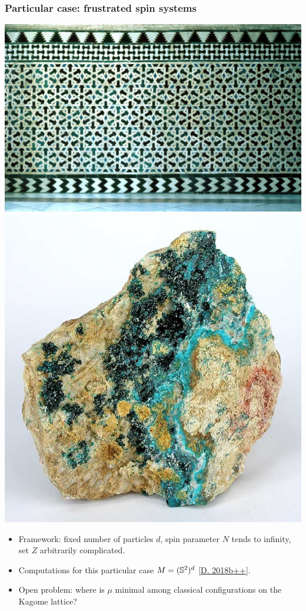 \documentclass[mathserif]{beamer}
\newcommand{\mycite}[1]{{\color{mygreen} \small #1}}
\begin{document}
\begin{frame}
  \frametitle{Particular case: frustrated spin systems}
  \begin{center}
    \includegraphics[scale=6]{Alcazar.png}\includegraphics[scale=0.16]{Herbertsmithite.jpg}
  \end{center}
  \begin{itemize}
\item  Framework: fixed number of particles $d$, spin parameter $N$
  tends to infinity, set $Z$ arbitrarily complicated.

  \item<2->{Computations for this particular case
    $M=(\S^2)^d$ \mycite{[\underline{D. 2018b++}]}.}

  \item<3>{{\color{myorange} Open problem}: where is $\mu$ minimal among classical
      configurations on the Kagome lattice?}
  \end{itemize}
\end{frame}
\end{document}
